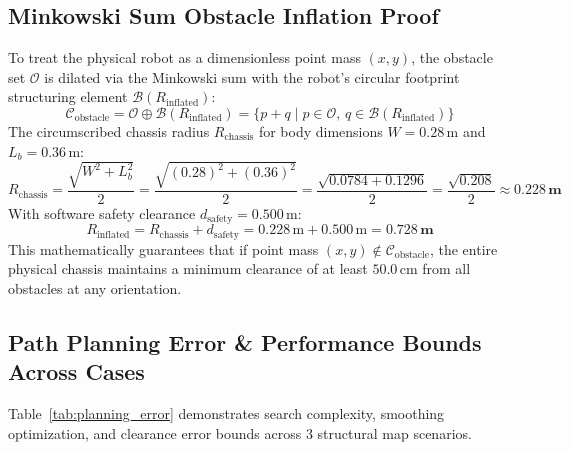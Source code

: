 \documentclass[11pt, a4paper]{article}
\begin{document}
\subsection{Minkowski Sum Obstacle Inflation Proof}
To treat the physical robot as a dimensionless point mass $(x, y)$, the obstacle set $\mathcal{O}$ is dilated via the Minkowski sum with the robot's circular footprint structuring element $\mathcal{B}(R_{\text{inflated}})$:
\begin{equation}
    \mathcal{C}_{\text{obstacle}} = \mathcal{O} \oplus \mathcal{B}(R_{\text{inflated}}) = \{ p + q \mid p \in \mathcal{O}, \, q \in \mathcal{B}(R_{\text{inflated}}) \}
\end{equation}
The circumscribed chassis radius $R_{\text{chassis}}$ for body dimensions $W = 0.28\,\text{m}$ and $L_b = 0.36\,\text{m}$:
\begin{equation}
    R_{\text{chassis}} = \frac{\sqrt{W^2 + L_b^2}}{2} = \frac{\sqrt{(0.28)^2 + (0.36)^2}}{2} = \frac{\sqrt{0.0784 + 0.1296}}{2} = \frac{\sqrt{0.208}}{2} \approx \mathbf{0.228\,\text{m}}
\end{equation}
With software safety clearance $d_{\text{safety}} = 0.500\,\text{m}$:
\begin{equation}
    R_{\text{inflated}} = R_{\text{chassis}} + d_{\text{safety}} = 0.228\,\text{m} + 0.500\,\text{m} = \mathbf{0.728\,\text{m}}
\end{equation}
This mathematically guarantees that if point mass $(x, y) \notin \mathcal{C}_{\text{obstacle}}$, the entire physical chassis maintains a minimum clearance of at least $50.0\,\text{cm}$ from all obstacles at any orientation.

\subsection{Path Planning Error & Performance Bounds Across Cases}
Table~\ref{tab:planning_error} demonstrates search complexity, smoothing optimization, and clearance error bounds across 3 structural map scenarios.
\end{document}
